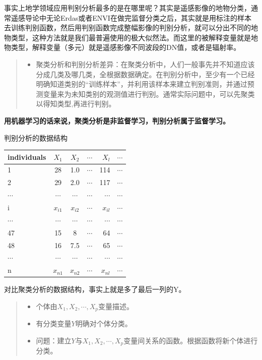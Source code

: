 \documentclass[]{ctexbook}
\providecommand{\tightlist}{%
  \setlength{\itemsep}{0pt}\setlength{\parskip}{0pt}}
\begin{document}
事实上地学领域应用判别分析最多的是在哪里呢？其实是遥感影像的地物分类，通常遥感导论中无论Erdas或者ENVI在做完监督分类之后，其实就是用标注的样本去训练判别函数，然后用判别函数完成整幅影像的判别分析，就可以分出不同的地物类型，这种方法就是我们最普遍使用的极大似然法。而这里的被解释变量就是地物类型，解释变量（多元）就是遥感影像不同波段的DN值，或者是辐射率。

\begin{quote}
\begin{itemize}
\tightlist
\item
  聚类分析和判别分析差异：在聚类分析中，人们一般事先并不知道应该分成几类及哪几类，全根据数据确定。在判别分析中，至少有一个已经明确知道类别的``训练样本''，并利用该样本来建立判别准则，并通过预测变量来为未知类别的观测值进行判别。通常实际问题中，可以先聚类以得知类型,再进行判别。
\end{itemize}
\end{quote}

\textbf{用机器学习的话来说，聚类分析是非监督学习，判别分析属于监督学习。}

判别分析的数据结构

\begin{longtable}[]{@{}lcccrr@{}}
\toprule
individuals & \(X_1\) & \(X_2\) & \(\cdots\) & \(X_l\) & \(\cdots\)\tabularnewline
\midrule
\endhead
1 & 28 & 1.0 & \(\cdots\) & 114 & \(\cdots\)\tabularnewline
2 & 29 & 2.0 & \(\cdots\) & 117 & \(\cdots\)\tabularnewline
\(\cdots\) & \(\cdots\) & \(\cdots\) & \(\cdots\) & \(\cdots\) & \(\cdots\)\tabularnewline
i & \(x_{i1}\) & \(x_{i2}\) & \(\cdots\) & \(x_{il}\) & \(\cdots\)\tabularnewline
\(\cdots\) & \(\cdots\) & \(\cdots\) & \(\cdots\) & \(\cdots\) & \(\cdots\)\tabularnewline
47 & 15 & 8 & \(\cdots\) & 64 & \(\cdots\)\tabularnewline
48 & 16 & 7.5 & \(\cdots\) & 65 & \(\cdots\)\tabularnewline
\(\cdots\) & \(\cdots\) & \(\cdots\) & \(\cdots\) & \(\cdots\) & \(\cdots\)\tabularnewline
n & \(x_{n1}\) & \(x_{n2}\) & \(\cdots\) & \(x_{nl}\) & \(\cdots\)\tabularnewline
\bottomrule
\end{longtable}

对比聚类分析的数据结构，事实上就是多了最后一列的Y。

\begin{quote}
\begin{itemize}
\tightlist
\item
  个体由\(X_1,X_2,\cdots,X_p\)变量描述。
\item
  有分类变量\(Y\)明确对个体分类。
\item
  问题：建立\(Y\)与\(X_1,X_2,\cdots,X_p\)变量间关系的函数。根据函数将新个体进行分类。
\end{itemize}
\end{quote}
\end{document}
